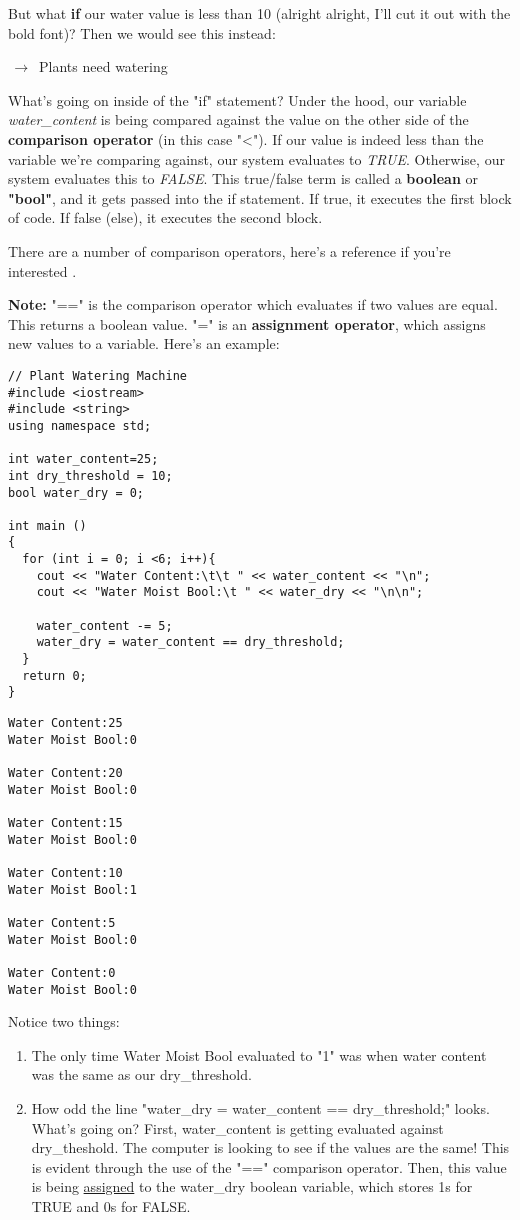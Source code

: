 \documentclass[a4paper]{article}
\begin{document}
But what \textbf{if} our water value is less than 10 (alright alright, I'll cut it out with the bold font)? Then we would see this instead:

$\,\to\,$ Plants need watering

What's going on inside of the "if" statement? Under the hood, our variable \textit{water\_content} is being compared against the value on the other side of the \textbf{comparison operator} (in this case "<"). If our value is indeed less than the variable we're comparing against, our system evaluates to \textit{TRUE}. Otherwise, our system evaluates this to \textit{FALSE}. This true/false term is called a \textbf{boolean} or \textbf{"bool"}, and it gets passed into the if statement. If true, it executes the first block of code. If false (else), it executes the second block.

There are a number of comparison operators, here's a reference if you're interested \cite{comp_op}.

\textbf{Note:} "==" is the comparison operator which evaluates if two values are equal. This returns a boolean value. "=" is an \textbf{assignment operator}, which assigns new values to a variable. Here's an example:
\begin{verbatim}
// Plant Watering Machine
#include <iostream>
#include <string>
using namespace std;

int water_content=25;
int dry_threshold = 10;
bool water_dry = 0;

int main ()
{
  for (int i = 0; i <6; i++){
    cout << "Water Content:\t\t " << water_content << "\n";
    cout << "Water Moist Bool:\t " << water_dry << "\n\n";
    
    water_content -= 5;
    water_dry = water_content == dry_threshold;
  }
  return 0;
}
\end{verbatim}

\begin{verbatim}
Water Content:25
Water Moist Bool:0

Water Content:20
Water Moist Bool:0

Water Content:15
Water Moist Bool:0

Water Content:10
Water Moist Bool:1

Water Content:5
Water Moist Bool:0

Water Content:0
Water Moist Bool:0
\end{verbatim}
Notice two things:
\begin{enumerate}
\item The only time Water Moist Bool evaluated to "1" was when water content was the same as our dry\_threshold.
\item How odd the line "water\_dry = water\_content == dry\_threshold;" looks. What's going on? First, water\_content is getting evaluated against dry\_theshold. The computer is looking to see if the values are the same! This is evident through the use of the "==" comparison operator. Then, this value is being \underline{assigned} to the water\_dry boolean variable, which stores 1s for TRUE and 0s for FALSE.
\end{enumerate}
\end{document}
